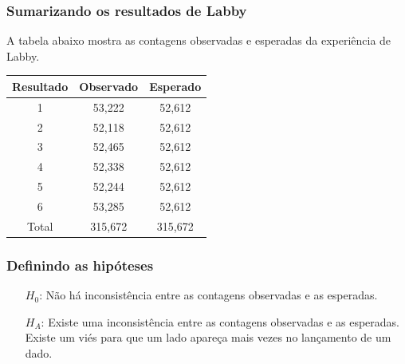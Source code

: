 
\begin{frame}
\frametitle{Sumarizando os resultados de Labby}
\justifying
A tabela abaixo mostra as contagens observadas e esperadas da experiência de Labby.

{
\begin{center}
\renewcommand\arraystretch{1.25}
\begin{tabular}{c | c c}
Resultado	& Observado	& Esperado \\
\hline
1		& 53,222		& 52,612 \\
2		& 52,118		& 52,612 \\
3		& 52,465		& 52,612 \\
4		& 52,338		& 52,612 \\
5		& 52,244		& 52,612 \\
6		& 53,285		& 52,612 \\
\hline
Total		& 315,672		& 315,672
\end{tabular}
\end{center}
}

\pause
\small{\justifying
{}
}
\end{frame}


\begin{frame}
\frametitle{Definindo as hipóteses}
\justifying
{}

\pause

\begin{itemize}
\justifying
\item[$H_0$:] Não há inconsistência entre as contagens observadas e as esperadas. 

\pause
\justifying
\item[$H_A$:] Existe uma inconsistência entre as contagens observadas e as esperadas.  Existe um viés para que um lado apareça mais vezes no lançamento de um dado.
\end{itemize}

\end{frame}

